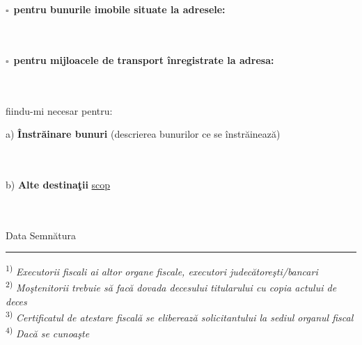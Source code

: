 \documentclass[10pt,a4paper]{article}
\newcommand{\fillline}[1][6cm]{\underline{\hspace{#1}}}
\newcommand{\checkboxempty}{$\square$}
\begin{document}
\vspace{0.25cm}

\checkboxempty\ \textbf{pentru bunurile imobile situate la adresele:} \fillline[8cm]
\\[0.2cm]
\hrulefill
\\[0.2cm]
\hrulefill
\\[0.2cm]
\hrulefill

\vspace{0.25cm}

\checkboxempty\ \textbf{pentru mijloacele de transport înregistrate la adresa:} \fillline[6.5cm]
\\[0.2cm]
\hrulefill
\\[0.2cm]
\hrulefill
\\[0.2cm]
\hrulefill

\vspace{0.25cm}

fiindu-mi necesar pentru:

\vspace{0.2cm}

a) \textbf{Înstrăinare bunuri} (descrierea bunurilor ce se înstrăinează) \fillline[6cm]
\\[0.2cm]
\hrulefill
\\[0.2cm]
\hrulefill
\\[0.2cm]
\hrulefill

\vspace{0.3cm}

b) \textbf{Alte destinaţii} \underline{ {{scop}} }
\\[0.2cm]
\hrulefill
\\[0.2cm]
\hrulefill
\\[0.2cm]
\hrulefill

\vspace{0.25cm}

\hspace{1cm}Data \fillline[3cm] \hfill Semnătura \fillline[5cm]\hspace{1cm}

\vspace{0.3cm}

\hrule
\vspace{0.2cm}
{\footnotesize
\textsuperscript{1)} \textit{Executorii fiscali ai altor organe fiscale, executori judecătoreşti/bancari}\\
\textsuperscript{2)} \textit{Moştenitorii trebuie să facă dovada decesului titularului cu copia actului de deces}\\
\textsuperscript{3)} \textit{Certificatul de atestare fiscală se eliberează solicitantului la sediul organul fiscal}\\
\textsuperscript{4)} \textit{Dacă se cunoaşte}
}
\end{document}
